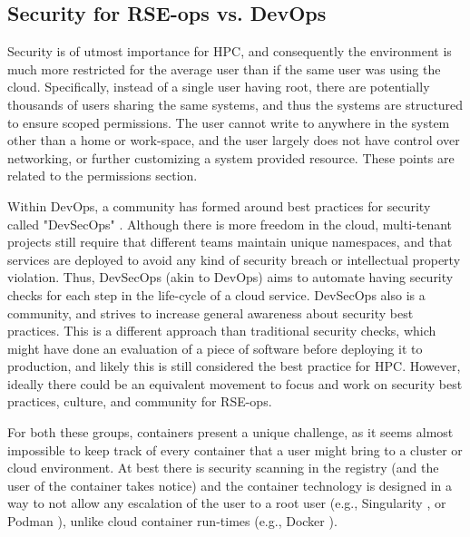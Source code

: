 \subsection{Security for RSE-ops vs. DevOps}


Security is of utmost importance for HPC, and consequently the environment is much more restricted for the average user than if the same user was using the cloud. Specifically, instead of a single user having root, there are potentially thousands of users sharing the same systems, and thus the systems are structured to ensure scoped permissions. The user cannot write to anywhere in the system other than
a home or work-space, and the user largely does not have control over networking, or further customizing a system provided resource. These points are related to the permissions section.

Within DevOps, a community has formed around best practices for security called "DevSecOps" \cite{noauthor_undated-yd}. Although there is more freedom in the cloud, multi-tenant projects still require that different teams maintain unique namespaces, and that services are  deployed to avoid any kind of security breach or intellectual property violation. Thus, DevSecOps (akin to DevOps) aims to automate having security checks for
each step in the life-cycle of a cloud service. DevSecOps also is a community, and strives to increase general awareness about security best practices. This is a different approach than traditional security checks, which might have done an evaluation of a piece of software before deploying it to production, and likely this is still considered the best practice for HPC. However, ideally there could be an equivalent movement to focus and work on security best practices, culture, and community for RSE-ops.

For both these groups, containers present a unique challenge, as it seems almost impossible to keep track of every container that a user might bring to a cluster or cloud environment. At best there is security scanning in the registry (and the user of the container takes notice) and the container technology is designed in a way to not allow any escalation of the user to a root user (e.g., Singularity \cite{singularity}, or Podman \cite{podman}), unlike cloud container run-times (e.g., Docker \cite{docker}).
